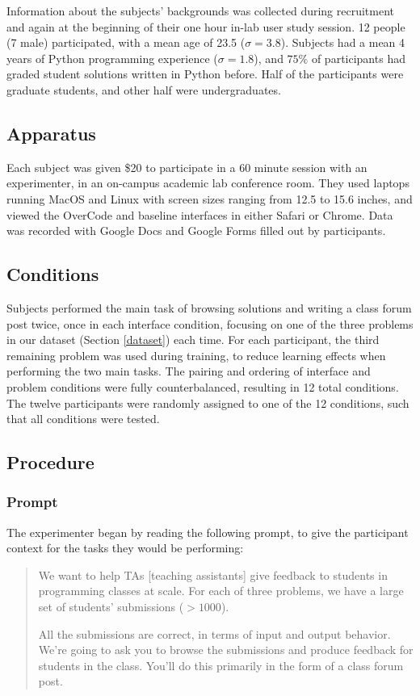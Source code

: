 Information about the subjects' backgrounds was collected during recruitment and again at the beginning of their one hour in-lab user study session. 12 people (7 male) participated, with a mean age of 23.5 ($\sigma = 3.8$). Subjects had a mean 4 years of Python programming experience ($\sigma = 1.8$), and $75\%$ of participants had graded student solutions written in Python before. Half of the participants were graduate students, and other half were undergraduates.

\subsection{Apparatus}

Each subject was given \$20 to participate in a 60 minute session with an experimenter, in an on-campus academic lab conference room. They used laptops running MacOS and Linux with screen sizes ranging from 12.5 to 15.6 inches, and viewed the OverCode and baseline interfaces in either Safari or Chrome. Data was recorded with Google Docs and Google Forms filled out by participants.
\subsection{Conditions}

Subjects performed the main task of browsing solutions and writing a class forum post twice, once in each interface condition, focusing on one of the three problems in our dataset (Section \ref{dataset}) each time. For each participant, the third remaining problem was used during training, to reduce learning effects when performing the two main tasks. The pairing and ordering of interface and problem conditions were fully counterbalanced, resulting in 12 total conditions. The twelve participants were randomly assigned to one of the 12 conditions, such that all conditions were tested.

\subsection{Procedure}

\subsubsection{Prompt}
The experimenter began by reading the following prompt, to give the participant context for the tasks they would be performing:

\begin{quote}

We want to help TAs [teaching assistants] give feedback to students in programming classes at scale. For each of three problems, we have a large set of students' submissions ($> 1000$). 

All the submissions are correct, in terms of input and output behavior. We're going to ask you to browse the submissions and produce feedback for students in the class. You'll do this primarily in the form of a class forum post.
\end{quote}

